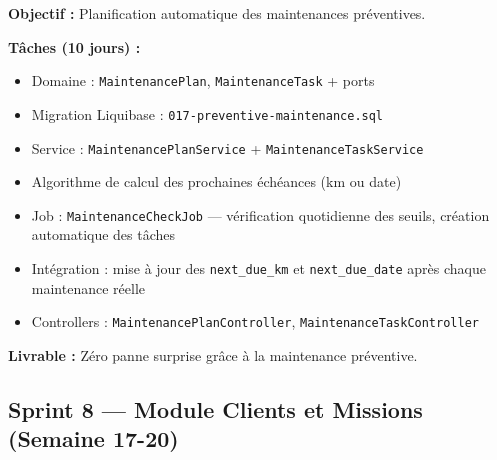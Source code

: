\documentclass[12pt,a4paper]{report}
\begin{document}
\begin{tcolorbox}[colback=fleetcyan!5, colframe=fleetcyan, title={\bfseries Sprint 7 — Maintenance Préventive}]
\textbf{Objectif :} Planification automatique des maintenances préventives.

\textbf{Tâches (10 jours) :}
\begin{itemize}[leftmargin=1.5cm]
  \item Domaine : \texttt{MaintenancePlan}, \texttt{MaintenanceTask} + ports
  \item Migration Liquibase : \texttt{017-preventive-maintenance.sql}
  \item Service : \texttt{MaintenancePlanService} + \texttt{MaintenanceTaskService}
  \item Algorithme de calcul des prochaines échéances (km ou date)
  \item Job : \texttt{MaintenanceCheckJob} — vérification quotidienne des seuils, création automatique des tâches
  \item Intégration : mise à jour des \texttt{next\_due\_km} et \texttt{next\_due\_date} après chaque maintenance réelle
  \item Controllers : \texttt{MaintenancePlanController}, \texttt{MaintenanceTaskController}
\end{itemize}

\textbf{Livrable :} Zéro panne surprise grâce à la maintenance préventive.
\end{tcolorbox}

\subsection{Sprint 8 — Module Clients et Missions (Semaine 17-20)}
\end{document}
